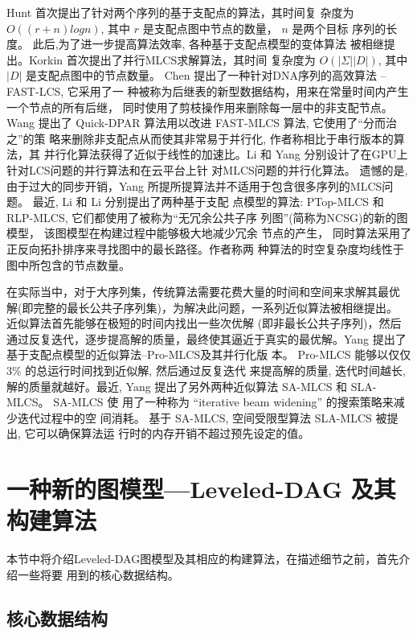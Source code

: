 Hunt \cite{Hunt1977} 首次提出了针对两个序列的基于支配点的算法，其时间复
杂度为 $O((r+n)logn)$, 其中 $r$ 是支配点图中节点的数量， $n$ 是两个目标
序列的长度。 此后,为了进一步提高算法效率, 各种基于支配点模型的变体算法
被相继提出。Korkin \cite{Korkin2001} 首次提出了并行MLCS求解算法，其时间
复杂度为 $O(|\Sigma||D|)$, 其中 $|D|$ 是支配点图中的节点数量。 Chen
\cite{Chen2006} 提出了一种针对DNA序列的高效算法 -- FAST-LCS, 它采用了一
种被称为后继表的新型数据结构，用来在常量时间内产生一个节点的所有后继，
同时使用了剪枝操作用来删除每一层中的非支配节点。 Wang \cite{Wang2011}
提出了 Quick-DPAR 算法用以改进 FAST-MLCS 算法, 它使用了“分而治之”的策
略来删除非支配点从而使其非常易于并行化, 作者称相比于串行版本的算法，其
并行化算法获得了近似于线性的加速比。Li \cite{Li2012} 和 Yang
\cite{Yang2010} 分别设计了在GPU上针对LCS问题的并行算法和在云平台上针
对MLCS问题的并行化算法。 遗憾的是, 由于过大的同步开销，Yang
\cite{Yang2010} 所提所提算法并不适用于包含很多序列的MLCS问题。 最近,
Li \cite{Li2016_ICDE} 和 Li \cite{Li2016_SIGKDD} 分别提出了两种基于支配
点模型的算法: PTop-MLCS 和 RLP-MLCS, 它们都使用了被称为“无冗余公共子序
列图”(简称为NCSG)的新的图模型， 该图模型在构建过程中能够极大地减少冗余
节点的产生， 同时算法采用了正反向拓扑排序来寻找图中的最长路径。作者称两
种算法的时空复杂度均线性于图中所包含的节点数量。

在实际当中，对于大序列集，传统算法需要花费大量的时间和空间来求解其最优
解(即完整的最长公共子序列集)，为解决此问题，一系列近似算法被相继提出。
近似算法首先能够在极短的时间内找出一些次优解 (即非最长公共子序列)，然后
通过反复迭代，逐步提高解的质量，最终使其逼近于真实的最优解。Yang
\cite{Yang2013} 提出了基于支配点模型的近似算法--Pro-MLCS及其并行化版
本。 Pro-MLCS 能够以仅仅 $3\%$ 的总运行时间找到近似解, 然后通过反复迭代
来提高解的质量, 迭代时间越长, 解的质量就越好。最近, Yang
\cite{Yang2014} 提出了另外两种近似算法 SA-MLCS 和 SLA-MLCS。 SA-MLCS 使
用了一种称为 “iterative beam widening” 的搜索策略来减少迭代过程中的空
间消耗。 基于 SA-MLCS, 空间受限型算法 SLA-MLCS 被提出, 它可以确保算法运
行时的内存开销不超过预先设定的值。


\section{一种新的图模型---Leveled-DAG 及其构建算法}
\label{sec:Algorithm}

本节中将介绍Leveled-DAG图模型及其相应的构建算法，在描述细节之前，首先介绍一些将要
用到的核心数据结构。

\subsection{核心数据结构}
\label{sec:data structures}

